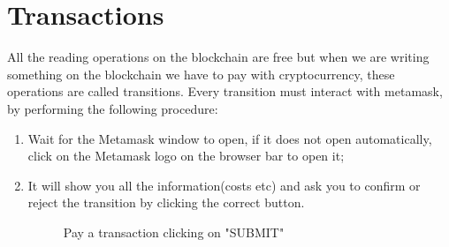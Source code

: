 \documentclass[ManualeUtente]{subfiles}
\begin{document}
\section{Transactions}
All the reading operations on the blockchain are free but when we are writing something on the blockchain we have to pay with cryptocurrency, these operations are called transitions.  
Every transition must interact with metamask, by performing the following procedure:
\begin{enumerate}
	\item Wait for the Metamask window to open, if it does not open automatically, click on the Metamask logo on the browser bar to open it;
	\item It will show you all the information(costs etc) and ask you to confirm or reject the transition by clicking the correct button.
	\begin{figure}[H]
		\centering
		\caption{Pay a transaction clicking on "SUBMIT"}
		\label{fig:Pay a transaction clicking on "SUBMIT"}
	\end{figure}
\end{enumerate}

\newpage
\end{document}
